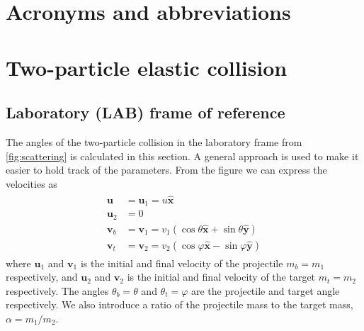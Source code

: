 \documentclass[twoside,english]{uiofysmaster/uiofysmaster}
\let\orgautoref\autoref
\renewcommand{\autoref}
        {%
		 \def\sectionautorefname{Section}%
		 \def\subsectionautorefname{Section}%
		 \def\subsubsectionautorefname{Section}%
		 \def\chapterautorefname{Chapter}%
          \orgautoref}
\begin{document}
\begin{appendices}

\chapter{Acronyms and abbreviations}\label{ch:acronyms}

\begin{table}[ht] 
	\centering 
	
	\label{tab:acro}
\end{table}



\chapter{Two-particle elastic collision}\label{ch:scattering}
\section{Laboratory (LAB) frame of reference}\label{sec:LAB}
The angles of the two-particle collision in the laboratory frame from \autoref{fig:scattering} is calculated in this section. 
A general approach is used to make it easier to hold track of the parameters. 
From the figure we can express the velocities as
\begin{align}\label{eq:2p-LAB-collision}
\begin{split}
	 \boldsymbol{u} &= \boldsymbol{u}_1 = u \boldsymbol{\hat{x}}  \\
	 \boldsymbol{u}_2 &= 0  \\
	 \boldsymbol{v}_b &= \boldsymbol{v}_1 = v_1 (\cos \theta \boldsymbol{\hat{x}} + \sin \theta \boldsymbol{\hat{y}})  \\
	\boldsymbol{v}_t &= \boldsymbol{v}_2 = v_2 (\cos \varphi \boldsymbol{\hat{x}} - \sin \varphi \boldsymbol{\hat{y}})
\end{split}
\end{align}
where $\boldsymbol{u}_1$ and $\boldsymbol{v}_1$ is the initial and final velocity of the projectile $m_b = m_1$ respectively, and $\boldsymbol{u}_2$ and $\boldsymbol{v}_2$ is the initial and final velocity of the target $m_t = m_2$ respectively. The angles $\theta_b = \theta$ and $\theta_t = \varphi$ are the projectile and target angle respectively. We also introduce a ratio of the projectile mass to the target mass, $\alpha = m_1/m_2$.


\end{appendices}
\end{document}
